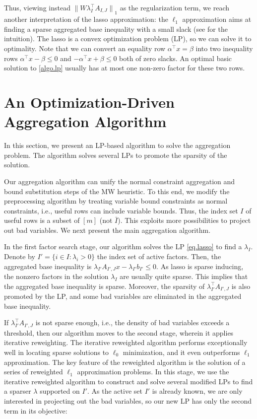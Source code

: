 \documentclass[a4paper,UKenglish,cleveref, autoref,  thm-restate]{lipics-v2021}
\def\ie{{i.e.,} }
\newcommand{\norm}[1]{{\lVert#1\rVert}}
\begin{document}
	
	Thus, viewing instead $\norm{ W \lambda_I^\top A_{I,J}}_1$ as the regularization term, we reach another interpretation of the lasso approximation: the $\ell_1$ approximation aims at finding a sparse aggregated base inequality with a small slack (see  for the intuition). The lasso is a convex optimization problem (LP), so we can solve it to optimality.  Note that we can convert an equality row $\alpha^\top x = \beta $ into two inequality rows $\alpha^\top x - \beta \le 0 $ and $-\alpha^\top x + \beta \le 0  $ both of zero slacks. An optimal basic solution to \eqref{algo.lp} usually has at most one non-zero factor for these two rows. 
	
	
	\section{An Optimization-Driven Aggregation Algorithm} \label{sec.opt}
	
	
	In this section, we present an LP-based algorithm to solve the aggregation problem. The algorithm solves several LPs to promote the sparsity of the solution.
	
	
	Our aggregation algorithm can unify the normal constraint aggregation and bound substitution steps of the MW heuristic. To this end, we modify the preprocessing algorithm by treating variable bound constraints as normal constraints, \ie useful rows can include variable bounds. Thus, the index set $I$ of useful rows is a subset of $[m]$ (not $\bar{I}$). This exploits more possibilities to project out bad variables. We next present the main aggregation algorithm.
	
	
	In the first factor search stage, our algorithm solves the LP \eqref{eq.lasso} to find a $\lambda_I$.  Denote by  $I' = \{i \in I: \lambda_i > 0\}$ the index set of active factors. Then, the aggregated base inequality is $\lambda_{I'} A_{I',J} x  - \lambda_{I'} b_{I'} \le 0 $. As lasso is sparse inducing, the nonzero factors in the solution  $\lambda_I$ are usually quite sparse. This implies that the  aggregated base inequality is sparse.   Moreover, the sparsity of $\lambda_{I'}^\top A_{I',J}$ is also promoted by the LP, and some bad variables are eliminated in the aggregated base inequality.
	
	
	
	
	
	
	
	
	If  $ \lambda_{I'}^\top A_{I',J}$ is not sparse enough, \ie the density of bad variables exceeds a threshold, then our algorithm moves to the second stage, wherein it applies iterative reweighting. The iterative reweighted algorithm \cite{candes2008enhancing} performs exceptionally well in locating sparse solutions to $\ell_0$ minimization, and it even outperforms $\ell_1$
	approximation. The key feature of the reweighted algorithm
	is the solution of a series of reweighted $\ell_1$
	approximation problems. In this stage,
	we use the iterative reweighted algorithm to construct and solve several modified LPs to find a sparser $\lambda$ supported on $I'$. As the active set $I'$ is already known, we are only interested in projecting out the bad variables, so our new LP has only the second term in its objective:
	
\end{document}
